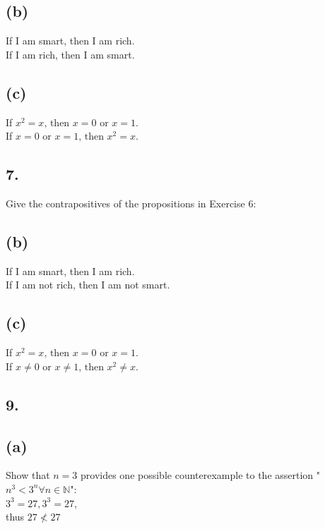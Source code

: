 \documentclass[11pt]{article}
\begin{document}
\subsection*{(b)}
\begin{center}
If I am smart, then I am rich.\\
\hfill \break
If I am rich, then I am smart.
\end{center}

\subsection*{(c)}
\begin{center}
If $x^{2} = x \text{, then } x = 0 \text{ or } x = 1$.\\
\hfill \break
If $x = 0 \text{ or } x = 1 \text{, then } x^{2} = x$.
\end{center}
%
%
\subsection*{7.}
\begin{center}
Give the contrapositives of the propositions in Exercise 6:
\end{center}

\subsection*{(b)}
\begin{center}
If I am smart, then I am rich.\\
\hfill \break
If I am not rich, then I am not smart.
\end{center}

\subsection*{(c)}
\begin{center}
If $x^{2} = x \text{, then } x = 0 \text{ or } x = 1$.\\
\hfill \break
If $x \neq 0 \text{ or } x \neq 1 \text{, then } x^{2} \neq x$.
\end{center}
%
%
\subsection*{9.}

\subsection*{(a)}
\begin{center}
Show that $n = 3$ provides one possible counterexample to the assertion "$n^{3} < 3^{n} \forall n \in \mathbb{N}$":\\
\hfill \break
$3^{3} = 27, 3^{3} = 27$,\\
thus $27 \nless 27$
\end{center}
\end{document}
